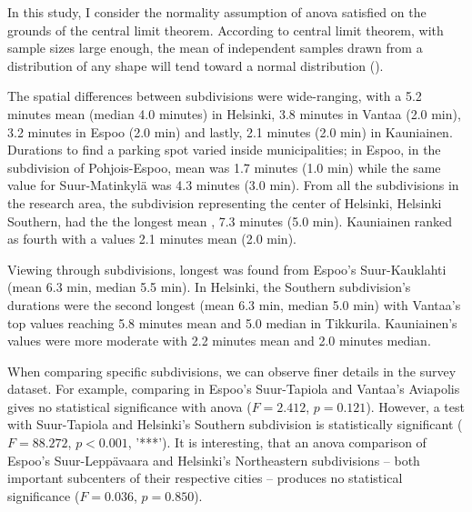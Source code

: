 In this study, I consider the normality assumption of \acrshort{anova} satisfied on the grounds of the central limit theorem. According to central limit theorem, with sample sizes large enough, the mean of independent samples drawn from a distribution of any shape will tend toward a normal distribution (\cite{Kwak2017}).

The spatial differences between subdivisions were wide-ranging, with a 5.2 minutes mean (median 4.0 minutes)  in Helsinki, 3.8 minutes in Vantaa (2.0 min), 3.2 minutes in Espoo (2.0 min) and lastly, 2.1 minutes (2.0 min) in Kauniainen. Durations to find a parking spot varied inside municipalities; in Espoo, in the subdivision of Pohjois-Espoo, mean  was 1.7 minutes (1.0 min) while the same value for Suur-Matinkylä was 4.3 minutes (3.0 min). From all the subdivisions in the research area, the subdivision representing the center of Helsinki, Helsinki Southern, had the the longest mean , 7.3 minutes (5.0 min). Kauniainen ranked as fourth with a  values 2.1 minutes mean (2.0 min).

Viewing  through subdivisions, longest  was found from Espoo's Suur-Kauklahti (mean 6.3 min, median 5.5 min). In Helsinki, the Southern subdivision's durations were the second longest (mean 6.3 min, median 5.0 min) with Vantaa's top values reaching 5.8 minutes mean and 5.0 median in Tikkurila. Kauniainen's  values were more moderate with 2.2 minutes mean and 2.0 minutes median.

When comparing specific subdivisions, we can observe finer details in the survey dataset. For example, comparing  in Espoo's Suur-Tapiola and Vantaa's Aviapolis gives no statistical significance with \acrshort{anova} ($F = 2.412$, $p = 0.121$). However, a test with Suur-Tapiola and Helsinki's Southern subdivision is statistically significant ($F = 88.272$, $p < 0.001$, ’***’). It is interesting, that an \acrshort{anova}  comparison of Espoo's Suur-Leppävaara and Helsinki's Northeastern subdivisions -- both important subcenters of their respective cities -- produces no statistical significance ($F = 0.036$, $p = 0.850$). 

